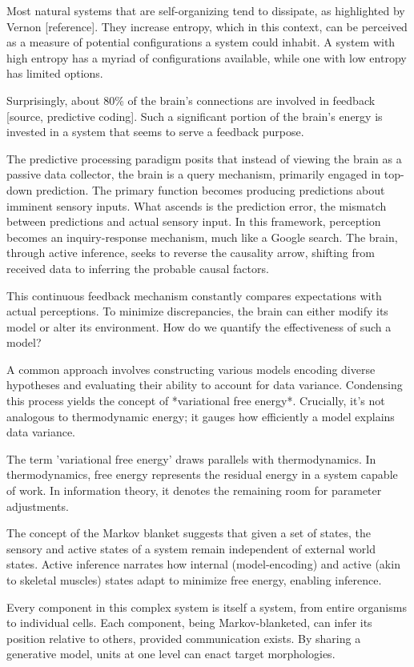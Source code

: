 Most natural systems that are self-organizing tend to dissipate, as highlighted by Vernon [reference]. They increase entropy, which in this context, can be perceived as a measure of potential configurations a system could inhabit. A system with high entropy has a myriad of configurations available, while one with low entropy has limited options.

Surprisingly, about 80\% of the brain's connections are involved in feedback [source, predictive coding]. Such a significant portion of the brain's energy is invested in a system that seems to serve a feedback purpose. 

The predictive processing paradigm posits that instead of viewing the brain as a passive data collector, the brain is a query mechanism, primarily engaged in top-down prediction. The primary function becomes producing predictions about imminent sensory inputs. What ascends is the prediction error, the mismatch between predictions and actual sensory input. In this framework, perception becomes an inquiry-response mechanism, much like a Google search. The brain, through active inference, seeks to reverse the causality arrow, shifting from received data to inferring the probable causal factors. 

This continuous feedback mechanism constantly compares expectations with actual perceptions. To minimize discrepancies, the brain can either modify its model or alter its environment. How do we quantify the effectiveness of such a model? 

A common approach involves constructing various models encoding diverse hypotheses and evaluating their ability to account for data variance. Condensing this process yields the concept of *variational free energy*. Crucially, it's not analogous to thermodynamic energy; it gauges how efficiently a model explains data variance.

The term 'variational free energy' draws parallels with thermodynamics. In thermodynamics, free energy represents the residual energy in a system capable of work. In information theory, it denotes the remaining room for parameter adjustments.

The concept of the Markov blanket suggests that given a set of states, the sensory and active states of a system remain independent of external world states. Active inference narrates how internal (model-encoding) and active (akin to skeletal muscles) states adapt to minimize free energy, enabling inference.

Every component in this complex system is itself a system, from entire organisms to individual cells. Each component, being Markov-blanketed, can infer its position relative to others, provided communication exists. By sharing a generative model, units at one level can enact target morphologies.

















